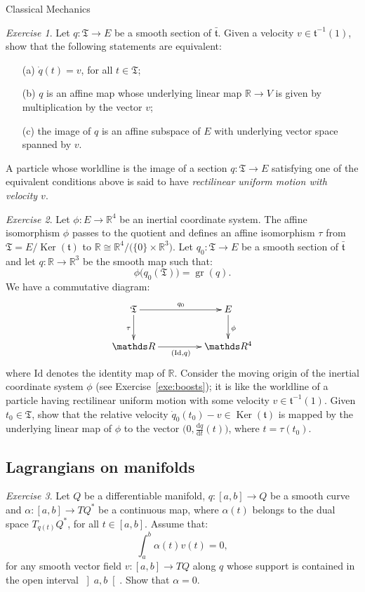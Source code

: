 \documentclass[oneside,a4paper,11pt]{amsbook}
\newcommand{\R}{\mathds R}
\newcommand{\dd}{\mathrm d}
\newcommand{\Id}{\mathrm{Id}}
\DeclareMathOperator{\Ker}{Ker}
\DeclareMathOperator{\Gr}{gr}
\theoremstyle{remark}\newtheorem{exercise}{Exercise}[chapter]
\theoremstyle{plain}\newtheorem{teo}{Theorem}[section]
\theoremstyle{plain}\newtheorem{lem}[teo]{Lemma}
\theoremstyle{plain}\newtheorem{prop}[teo]{Proposition}
\theoremstyle{plain}\newtheorem{cor}[teo]{Corollary}
\theoremstyle{definition}\newtheorem{defin}[teo]{Definition}
\theoremstyle{remark}\newtheorem{rem}[teo]{Remark}
\theoremstyle{definition}\newtheorem{notation}[teo]{Notation}
\theoremstyle{definition}\newtheorem{convention}[teo]{Convention}
\theoremstyle{definition}\newtheorem{example}[teo]{Example}
\numberwithin{section}{chapter}
\numberwithin{equation}{section}
\begin{document}
\begin{chapter}{Classical Mechanics}
\begin{exercise}
Let $q:\mathfrak T\to E$ be a smooth section of $\bar{\mathfrak t}$. Given a velocity
$v\in\mathfrak t^{-1}(1)$, show that the
following statements are equivalent:
\begin{itemize}
\item[(a)] $\dot q(t)=v$, for all $t\in\mathfrak T$;
\item[(b)] $q$ is an affine map whose underlying linear map $\R\to V$ is given by multiplication by the vector $v$;
\item[(c)] the image of $q$ is an affine subspace of $E$ with underlying vector space spanned by $v$.
\end{itemize}
A particle whose worldline is the image of a section $q:\mathfrak T\to E$ satisfying one of the equivalent conditions
above is said to have {\em rectilinear uniform motion with velocity $v$}.
\end{exercise}

\begin{exercise}
Let $\phi:E\to\R^4$ be an inertial coordinate system. The affine isomorphism $\phi$ passes to the quotient
and defines an affine isomorphism $\tau$ from $\mathfrak T=E/\Ker(\mathfrak t)$ to $\R\cong\R^4/\big(\{0\}\times\R^3\big)$.
Let $q_0:\mathfrak T\to E$ be a smooth section of $\bar{\mathfrak t}$ and let $q:\R\to\R^3$ be the smooth map such that:
\[\phi\big(q_0(\mathfrak T)\big)=\Gr(q).\]
We have a commutative diagram:
\[\xymatrix@C+20pt{%
\mathfrak T\ar[r]^{q_0}\ar[d]_\tau&E\ar[d]^\phi\\
\R\ar[r]_{(\Id,q)}&\R^4}\]
where $\Id$ denotes the identity map of $\R$. Consider the moving origin of the inertial coordinate system
$\phi$ (see Exercise~\ref{exe:boosts}); it is like the worldline of a particle having rectilinear uniform
motion with some velocity $v\in\mathfrak t^{-1}(1)$. Given $t_0\in\mathfrak T$, show that the relative velocity
$\dot q_0(t_0)-v\in\Ker(\mathfrak t)$ is mapped by the underlying linear map of $\phi$ to the vector
$\big(0,\frac{\dd q}{\dd t}(t)\big)$, where $t=\tau(t_0)$.
\end{exercise}

\subsection*{Lagrangians on manifolds}

\begin{exercise}\label{exe:genfundlemcalcvar}
Let $Q$ be a differentiable manifold, $q:[a,b]\to Q$ be a smooth curve and $\alpha:[a,b]\to TQ^*$ be a continuous map,
where $\alpha(t)$ belongs to the dual space $T_{q(t)}Q^*$, for all $t\in[a,b]$. Assume that:
\[\int_a^b\alpha(t)v(t)=0,\]
for any smooth vector field $v:[a,b]\to TQ$ along $q$ whose support is contained in the open interval
$\left]a,b\right[$. Show that $\alpha=0$.
\end{exercise}


\end{chapter}
\end{document}
